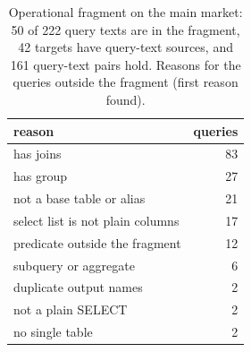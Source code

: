 
\begin{table}[tbp]
  \centering
  \footnotesize
  \caption{Operational fragment on the main market: 50 of 222 query texts are in the fragment, 42 targets have query-text sources, and 161 query-text pairs hold. Reasons for the queries outside the fragment (first reason found).}
  \label{tab:app-fragment}
  \begin{tabular}{@{}lr@{}}
    \toprule
    reason & queries \\
    \midrule
    has joins & 83 \\
    has group & 27 \\
    not a base table or alias & 21 \\
    select list is not plain columns & 17 \\
    predicate outside the fragment & 12 \\
    subquery or aggregate & 6 \\
    duplicate output names & 2 \\
    not a plain SELECT & 2 \\
    no single table & 2 \\
    \bottomrule
  \end{tabular}
\end{table}

